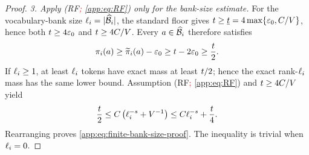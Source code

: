 \begin{proof}
\emph{3. Apply (RF\textcolor{red}{; \cref{app:eq:RF}}) only for the bank-size estimate.}
For the vocabulary-bank size $\ell_{i}=|\widehat{\mathcal B}_{i}|$,
the standard floor gives
$t\ge\underline t=4\max\{\varepsilon_0,C/V\}$,
hence both $t\ge4\varepsilon_0$ and
$t\ge4C/V$.
Every $a\in\widehat{\mathcal B}_{i}$ therefore satisfies
\begin{equation}
 \pi_{i}(a)
 \ge\widetilde\pi_{i}(a)-\varepsilon_0
 \ge t-2\varepsilon_0
 \ge\frac{t}{2}.
 \label{app:eq:bank-member-mass}
\end{equation}
If
$\ell_{i}\ge1$, at least $\ell_{i}$ tokens have exact mass at least
$t/2$; hence the exact rank-$\ell_{i}$ mass has the same
lower bound.  Assumption (RF\textcolor{red}{; \cref{app:eq:RF}}) and
$t\ge4C/V$ yield
\[
 \frac{t}{2}
 \le C
 \left(\ell_{i}^{-s}+V^{-1}\right)
 \le C\ell_{i}^{-s}
    +\frac{t}{4}.
\]
Rearranging proves \eqref{app:eq:finite-bank-size-proof}.  The inequality is
trivial when $\ell_{i}=0$.
\end{proof}

